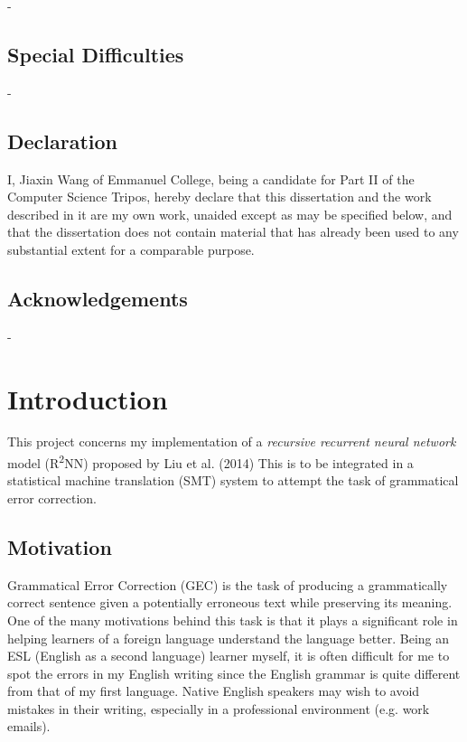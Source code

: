 \documentclass[12pt,a4paper,twoside,openright]{report}
\begin{document}
-

\section*{Special Difficulties}

-
 
\newpage
\section*{Declaration}

I, Jiaxin Wang of Emmanuel College, being a candidate for Part II of the Computer
Science Tripos, hereby declare that this dissertation and the work described in 
it are my own work, unaided except as may be specified below, and that the dissertation
does not contain material that has already been used to any substantial
extent for a comparable purpose.

\bigskip
{}

\medskip
{}

\tableofcontents

\listoffigures

\newpage
\section*{Acknowledgements}

-

\listoftodos

\pagestyle{headings}

\chapter{Introduction}

This project concerns my implementation of a \textit{recursive recurrent neural network} model (R\textsuperscript{2}NN) proposed by Liu et al. (2014) \cite{r2nn} This is to be integrated in a statistical machine translation (SMT) system to attempt the task of grammatical error correction. 

\section{Motivation}

Grammatical Error Correction (GEC) is the task of producing a grammatically correct sentence given a potentially erroneous text while preserving its meaning. One of the many motivations behind this task is that it plays a significant role in helping learners of a foreign language understand the language better. Being an ESL (English as a second language) learner myself, it is often difficult for me to spot the errors in my English writing since the English grammar is quite different from that of my first language. Native English speakers may wish to avoid mistakes in their writing, especially in a professional environment (e.g. work emails). 
\end{document}
